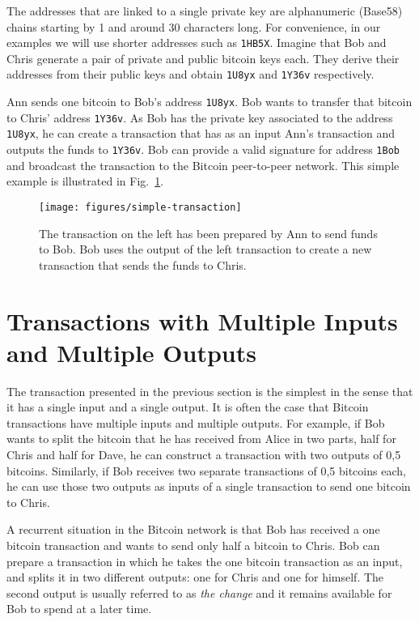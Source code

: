 \documentclass[journal]{IEEEtran}
\begin{document}
The addresses that are linked to a single private key are alphanumeric (Base58) chains starting by 1 and around 30 characters long.
For convenience, in our examples we will use shorter addresses such as \texttt{1HB5X}.
Imagine that Bob and Chris generate a pair of private and public bitcoin keys each.
They derive their addresses from their public keys and obtain \texttt{1U8yx} and \texttt{1Y36v} respectively.

Ann sends one bitcoin to Bob's address \texttt{1U8yx}.
Bob wants to transfer that bitcoin to Chris' address \texttt{1Y36v}.
As Bob has the private key associated to the address \texttt{1U8yx}, he can create a transaction that has as an input Ann's transaction and outputs the funds to \texttt{1Y36v}.
Bob can provide a valid signature for address \texttt{1Bob} and broadcast the transaction to the Bitcoin peer-to-peer network.
This simple example is illustrated in Fig.~\ref{fig:simple-transaction}.

\begin{figure}[!t]
\centering
\texttt{[image: figures/simple-transaction]}
\caption{The transaction on the left has been prepared by Ann to send funds to Bob. Bob uses the output of the left transaction to create a new transaction that sends the funds to Chris.}
\label{fig:simple-transaction}
\end{figure}

\section{Transactions with Multiple Inputs and Multiple Outputs}

The transaction presented in the previous section is the simplest in the sense that it has a single input and a single output.
It is often the case that Bitcoin transactions have multiple inputs and multiple outputs.
For example, if Bob wants to split the bitcoin that he has received from Alice in two parts, half for Chris and half for Dave, he can construct a transaction with two outputs of 0,5 bitcoins.
Similarly, if Bob receives two separate transactions of 0,5 bitcoins each, he can use those two outputs as inputs of a single transaction to send one bitcoin to Chris.

A recurrent situation in the Bitcoin network is that Bob has received a one bitcoin transaction and wants to send only half a bitcoin to Chris.
Bob can prepare a transaction in which he takes the one bitcoin transaction as an input, and splits it in two different outputs: one for Chris and one for himself.
The second output is usually referred to as \emph{the change} and it remains available for Bob to spend at a later time.
\end{document}
